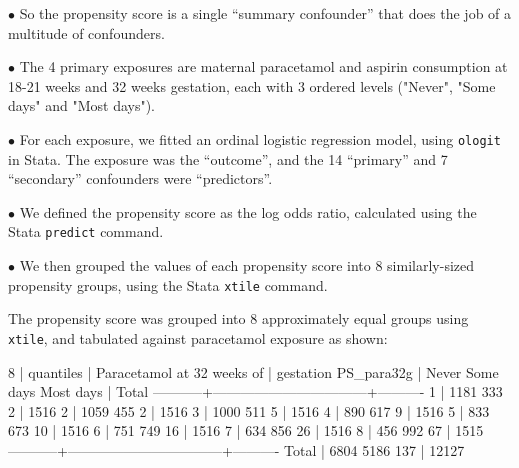 \item{$\bullet$} So the propensity score is a single ``summary confounder'' that does the job of a multitude of confounders.

\enditems

\vfill\eject
\line{}\vfill


\beginitems

\item{$\bullet$} The 4 primary exposures are maternal paracetamol and aspirin consumption at 18-21 weeks and 32 weeks gestation,
each with 3 ordered levels ("Never", "Some days" and "Most days").

\item{$\bullet$} For each exposure, we fitted an ordinal logistic regression model,
using {\tt ologit} in Stata.
The exposure was the ``outcome'', and the 14 ``primary'' and 7 ``secondary'' confounders were ``predictors''.

\item{$\bullet$} We defined the propensity score as the log odds ratio, calculated using the Stata {\tt predict} command.

\item{$\bullet$} We then grouped the values of each propensity score into 8 similarly-sized propensity groups,
using the Stata {\tt xtile} command.

\enditems

\vfill\eject
\vfill


\centerline{
}

\vfill\eject
\vfill


The propensity score was grouped into 8 approximately equal groups using {\tt xtile}, and tabulated
against paracetamol exposure as shown:

\startlisting

         8 |
 quantiles |     Paracetamol at 32 weeks
        of |            gestation
PS_para32g |     Never  Some days  Most days |     Total
-----------+---------------------------------+----------
         1 |      1181        333          2 |      1516 
         2 |      1059        455          2 |      1516 
         3 |      1000        511          5 |      1516 
         4 |       890        617          9 |      1516 
         5 |       833        673         10 |      1516 
         6 |       751        749         16 |      1516 
         7 |       634        856         26 |      1516 
         8 |       456        992         67 |      1515 
-----------+---------------------------------+----------
     Total |      6804       5186        137 |     12127 

